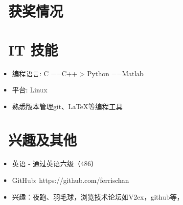 \documentclass{resume}
\begin{document}
\section{\faHeartO\ 获奖情况}
  
\section{\faCogs\ IT 技能}
\begin{itemize}[parsep=0.5ex]
  \item 编程语言: C ==C++  > Python ==Matlab
  \item 平台: Linux
  \item 熟悉版本管理git、LaTeX等编程工具
\end{itemize}

\section{\faInfo\ 兴趣及其他}
\begin{itemize}[parsep=0.5ex] 
  \item 英语 - 通过英语六级（486）
  \item GitHub: https://github.com/ferrischan
  \item 兴趣：夜跑、羽毛球，浏览技术论坛如V2ex，github等，
\end{itemize}

%
%
\end{document}
